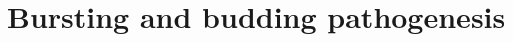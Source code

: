 
\chapter{Bursting and budding pathogenesis}
\label{path:ch:pathogenesis}








\begingroup
\renewcommand{\theHsection}{\thechapter.appendix.\Alph{section}}
\renewcommand{\theHsubsection}{\theHsection.\arabic{subsection}}
\renewcommand{\theHsubsubsection}{\theHsubsection.\arabic{subsubsection}}


\endgroup
